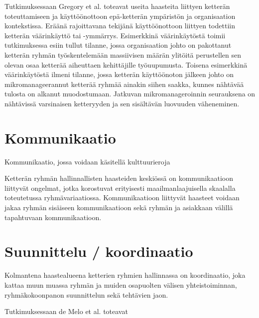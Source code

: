 Tutkimuksessaan Gregory et al. \cite{GREGORY201692} toteavat useita haasteita liittyen ketterän toteuttamiseen ja käyttöönottoon epä-ketterän ympäristön ja organisaation kontekstissa. Eräänä rajoittavana tekijänä käyttöönottoon liittyen todettiin ketterän väärinkäyttö tai -ymmärrys. Esimerkkinä väärinkäytöstä toimii tutkimuksessa esiin tullut tilanne, jossa organisaation johto on pakottanut ketterän ryhmän työskentelemään massiivisen määrän ylitöitä perustellen sen olevan osaa ketterää aiheuttaen kehittäjille työuupumusta. Toisena esimerkkinä väärinkäytöstä ilmeni tilanne, jossa ketterän käyttöönoton jälkeen johto on mikromanageerannut ketterää ryhmää ainakin siihen saakka, kunnes nähtävää tulosta on alkanut muodostumaan. Jatkuvan mikromanageroinnin seurauksena on nähtävissä varsinaisen ketteryyden ja sen sisältävän luovuuden väheneminen.


\section{Kommunikaatio}

Kommunikaatio, jossa voidaan käsitellä kulttuurieroja

Ketterän ryhmän hallinnallisten haasteiden keskiössä on kommunikaatioon liittyvät ongelmat, jotka korostuvat erityisesti maailmanlaajuisella skaalalla toteutetussa ryhmävariaatiossa. Kommunikaatioon liittyvät haasteet voidaan jakaa ryhmän sisäiseen kommunikaatioon sekä ryhmän ja asiakkaan välillä tapahtuvaan kommunikaatioon. 


\section{Suunnittelu / koordinaatio}

Kolmantena haastealueena ketterien ryhmien hallinnassa on koordinaatio, joka kattaa muun muassa ryhmän ja muiden osapuolten välisen yhteistoiminnan, ryhmäkokoonpanon suunnittelun sekä tehtävien jaon.

Tutkimuksessaan de Melo et al. \cite{DEOMELO2013412} toteavat 
